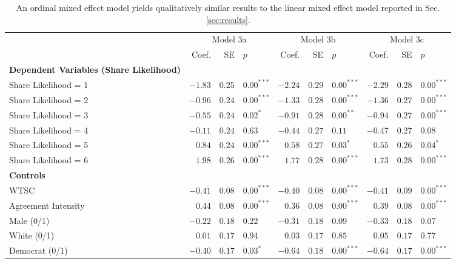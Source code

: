 \begin{table*}[]
    \footnotesize
    \centering
    \caption{An ordinal mixed effect model yields qualitatively similar results to the linear mixed effect model reported in Sec. \ref{sec:results}.}
    \begin{tabular}{lrrlrrlrrl}
    \toprule
         & \multicolumn{3}{c}{Model 3a} &  \multicolumn{3}{c}{Model 3b} &  \multicolumn{3}{c}{Model 3c}\\
    \cmidrule(lr){2-4}\cmidrule(lr){5-7}\cmidrule(lr){8-10}
     & Coef. & SE & $p$ & Coef. & SE & $p$ & Coef. & SE & $p$\\ \midrule
    \textbf{Dependent Variables (Share Likelihood)} \\ 
    Share Likelihood = 1 & $-1.83$ & $0.25$ & $0.00^{***}$& $-2.24$ & $0.29$ & $0.00^{***}$&$-2.29$ & $0.28$ & $0.00^{***}$ \\
    Share Likelihood = 2 & $-0.96$ & $0.24$ & $0.00^{***}$ & $-1.33$ & $0.28$ & $0.00^{***}$ & $-1.36$ & $0.27$ & $0.00^{***}$\\
    Share Likelihood = 3 & $-0.55$ & $0.24$ &$0.02^{*}$& $-0.91$ & $0.28$ & $0.00^{**}$ & $-0.94$ & $0.27$ & $0.00^{***}$\\
    Share Likelihood = 4 & $-0.11$ & $0.24$ &$0.63$& $-0.44$ & $0.27$ & $0.11$ & $-0.47$ & $0.27$ & $0.08$\\
    Share Likelihood = 5 & $0.84$ & $0.24$ &$0.00^{***}$& $0.58$ & $0.27$ & $0.03^{*}$ & $0.55$ & $0.26$ & $0.04^{*}$\\
    Share Likelihood = 6 & $1.98$ & $0.26$ &$0.00^{***}$& $1.77$ & $0.28$ & $0.00^{***}$ & $1.73$ & $0.28$ & $0.00^{***}$\\
    \textbf{Controls} \\
    WTSC & $-0.41$ & $0.08$ & $0.00^{***}$ &$-0.40$ &$0.08$ &$0.00^{***}$ &$-0.41$ & $0.09$ & $0.00^{***}$\\ 
    Agreement Intensity & $0.44$ & $0.08$ & $0.00^{***}$ & $0.36$ & $0.08$ & $0.00^{***}$ & $0.39$ & $0.08$ & $0.00^{***}$\\
    Male (0/1) & $-0.22$ & $0.18$ & $0.22$ & $-0.31$ & $0.18$ & $0.09$ & $-0.33$ & $0.18$ & $0.07$\\
    White (0/1) & $0.01$ & $0.17$ &$0.94$ & $0.03$ & $0.17$ & $0.85$ & $0.05$ & $0.17$ & $0.77$\\ 
    Democrat (0/1) & $-0.40$ & $0.17$ &$0.03^{*}$ & $-0.64$ & $0.18$ & $0.00^{***}$ & $-0.64$ & $0.17$ & $0.00^{***}$\\

\end{tabular}
\end{table*}
